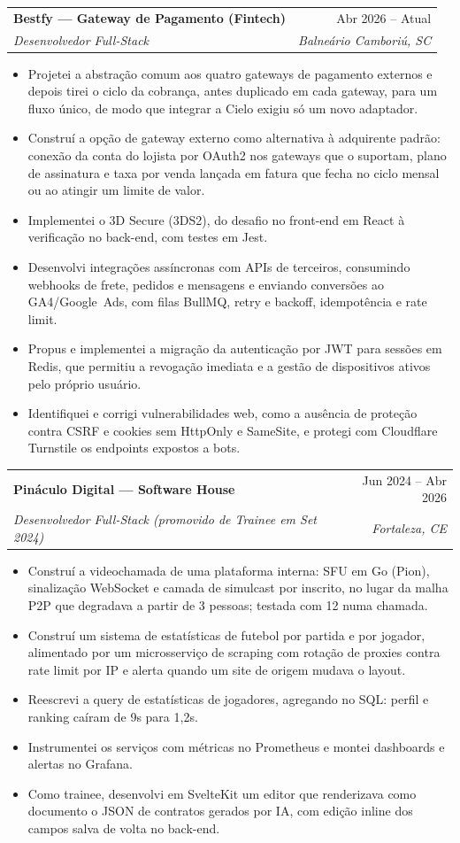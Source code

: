 \documentclass[a4paper,11pt]{article}
\makeatletter
\newcommand{\resumeItem}[1]{
  \item\small{#1\vspace{-2pt}}
}
\newcommand{\resumeSubheading}[4]{
  \vspace{-2pt}\item
    \begin{tabular*}{0.97\textwidth}[t]{l@{\extracolsep{\fill}}r}
      \textbf{#1} & \small #2 \\
      \textit{\small#3} & \textit{\small #4} \\
    \end{tabular*}\vspace{-7pt}
}
\newcommand{\resumeItemListStart}{\begin{itemize}}
\newcommand{\resumeItemListEnd}{\end{itemize}\vspace{-5pt}}
\makeatother
\begin{document}
  \resumeSubheading
    {Bestfy --- Gateway de Pagamento (Fintech)}{Abr 2026 -- Atual}
    {Desenvolvedor Full-Stack}{Balneário Camboriú, SC}
    \resumeItemListStart
      \resumeItem{Projetei a abstração comum aos quatro gateways de pagamento externos e depois tirei o ciclo da cobrança, antes duplicado em cada gateway, para um fluxo único, de modo que integrar a Cielo exigiu só um novo adaptador.}
      \resumeItem{Construí a opção de gateway externo como alternativa à adquirente padrão: conexão da conta do lojista por OAuth2 nos gateways que o suportam, plano de assinatura e taxa por venda lançada em fatura que fecha no ciclo mensal ou ao atingir um limite de valor.}
      \resumeItem{Implementei o 3D Secure (3DS2), do desafio no front-end em React à verificação no back-end, com testes em Jest.}
      \resumeItem{Desenvolvi integrações assíncronas com APIs de terceiros, consumindo webhooks de frete, pedidos e mensagens e enviando conversões ao GA4/Google~Ads, com filas BullMQ, retry e backoff, idempotência e rate limit.}
      \resumeItem{Propus e implementei a migração da autenticação por JWT para sessões em Redis, que permitiu a revogação imediata e a gestão de dispositivos ativos pelo próprio usuário.}
      \resumeItem{Identifiquei e corrigi vulnerabilidades web, como a ausência de proteção contra CSRF e cookies sem HttpOnly e SameSite, e protegi com Cloudflare Turnstile os endpoints expostos a bots.}
    \resumeItemListEnd

  \resumeSubheading
    {Pináculo Digital --- Software House}{Jun 2024 -- Abr 2026}
    {Desenvolvedor Full-Stack (promovido de Trainee em Set 2024)}{Fortaleza, CE}
    \resumeItemListStart
      \resumeItem{Construí a videochamada de uma plataforma interna: SFU em Go (Pion), sinalização
        WebSocket e camada de simulcast por inscrito, no lugar da malha P2P que degradava a partir de 3 pessoas; testada com 12 numa chamada.}
      \resumeItem{Construí um sistema de estatísticas de futebol por partida e por jogador, alimentado por
        um microsserviço de scraping com rotação de proxies contra rate limit por IP e alerta quando um site de origem mudava o layout.}
      \resumeItem{Reescrevi a query de estatísticas de jogadores, agregando no SQL: perfil e ranking
        caíram de 9s para 1,2s.}
      \resumeItem{Instrumentei os serviços com métricas no Prometheus e montei dashboards e alertas no Grafana.}
      \resumeItem{Como trainee, desenvolvi em SvelteKit um editor que renderizava como documento o JSON de contratos gerados por IA, com edição inline dos campos salva de volta no back-end.}
    \resumeItemListEnd
\end{document}
